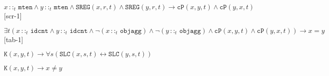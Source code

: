 \documentclass[ao]{iosart2x}
\newcommand{\nb}[1]{\textcolor{red}{$|$}\marginpar{\hspace*{-0cm}\parbox{20mm}{\scriptsize\raggedright\textcolor{red}{#1}}}}
\newcommand{\bflist}{\begin{list}{}{\setlength{\topsep}{2mm}\setlength{\parsep}{0mm}\setlength{\leftmargin}{9.2mm}\setlength{\labelwidth}{8mm}}}
\newcommand{\eflist}{\end{list}}
\newcommand{\bfoAxLabel}{\textrm{a$_\texttt{b}$}}
\newcommand{\dolceAxLabel}{\textrm{a$_\texttt{d}$}}
\newcommand{\dolceThrLabel}{\textrm{t$_\texttt{d}$}}
\newcommand{\dbDefLabel}{\textrm{d$_\texttt{db}$}}
\newcommand{\dbThrLabel}{\textrm{t$_\texttt{db}$}}
\newcounter{cntaxb}
\newcommand{\bfoax}[1]{\refstepcounter{cntaxb}\begin{small}{\bf \bfoAxLabel\thecntaxb\label{#1}}\end{small}}
\newcounter{cntax}
\newcommand{\dolceax}[1]{\refstepcounter{cntax}\begin{small}{\bf \dolceAxLabel\thecntax\label{#1}}\end{small}}
\newcounter{cntthr}
\newcommand{\dolceth}[1]{\refstepcounter{cntthr}\begin{small}{\bf \dolceThrLabel\thecntthr\label{#1}}\end{small}}
\newcounter{cntdbth}
\newcommand{\dbth}[1]{\refstepcounter{cntdbth}\begin{small}{\bf \dbThrLabel\thecntdbth\label{#1}}\end{small}}
\newcommand{\refdbdf}[1]{({\dbDefLabel}\ref{#1})}
\newcommand{\pr}[1]{\mathtt{#1}}
\newcommand{\cn}[1]{\mathtt{#1}}
\newcommand{\ifif}{\leftrightarrow}
\newcommand {\thdolcedbmap} {\ensuremath{\mathfrak{D}_\texttt{b}}}
\newcommand {\Kd} {\ensuremath{\pr{K}}}
\newcommand {\SLCd} {\ensuremath{\pr{SLC}}}
\newcommand{\idcntbcat}{\cn{idcnt}}
\newcommand{\mtenbcat}{\cn{mten}}
\newcommand{\objaggbcat}{\cn{objagg}}
\newcommand{\procbcat}{\cn{proc}}
\newcommand{\pbndbcat}{\cn{pbnd}}
\newcommand{\bfocpart}{\pr{cP}}
\newcommand{\bfoopart}{\pr{oP}}
\newcommand{\bfoexist}{\pr{EX}}
\newcommand{\bfoiof}[1]{{\,::_{#1\:\!}}}
\newcommand{\bfosregof}{\pr{SREG}}
\newcommand{\bfosregofocc}{\pr{SREG_O}}
\newcommand{\bfostregof}{\pr{STREG}}
\begin{document}
%
\bflist
\item[\bfoax{sregof_maten}]  $x \bfoiof{t} \mtenbcat \land y \bfoiof{t} \mtenbcat \land \bfosregof(x,r,t) \land \bfosregof(y,r,t) \to \bfocpart(x,y,t) \land \bfocpart(y,x,t)$ 
\hfill {\scriptsize [scr-1]}

\item[\bfoax{id_idcnt}] $\exists t(x \bfoiof{t} \idcntbcat \land y \bfoiof{t} \idcntbcat \land \neg(x \bfoiof{t} \objaggbcat) \land \neg(y \bfoiof{t} \objaggbcat) \land  \bfocpart(x,y,t) \land \bfocpart(y,x,t)) \to x=y$  
\hfill {\scriptsize [tab-1]}

\item[\dolceax{Kd_colocalization}] $\Kd(x,y,t) \to \forall s(\SLCd(x,s,t) \ifif \SLCd(y,s,t))$ 

\item[\dolceth{Kd_to_diff}] $\Kd(x,y,t) \to x \neq y$ 
\eflist
\end{document}
